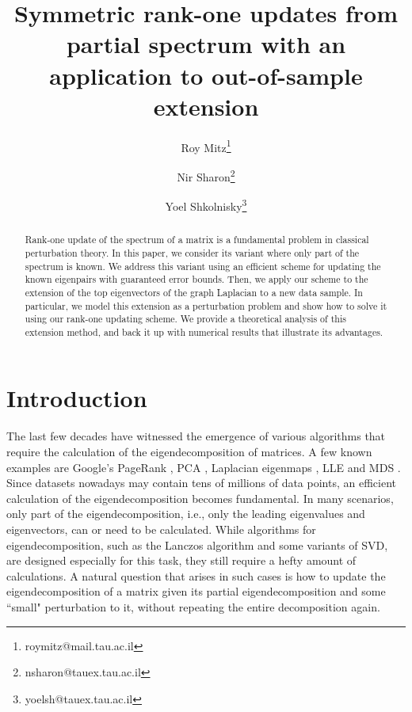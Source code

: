 \documentclass[11pt]{article}
\begin{document}
\title{Symmetric rank-one updates from partial spectrum with an application to out-of-sample extension}

\author[1]{Roy Mitz\thanks{roymitz@mail.tau.ac.il} }
\author[1]{Nir Sharon\thanks{nsharon@tauex.tau.ac.il} }
\author[1]{Yoel Shkolnisky\thanks{yoelsh@tauex.tau.ac.il}}
\date{}

\maketitle
\begin{abstract}
Rank-one update of the spectrum of a matrix is a fundamental problem in classical perturbation theory. In this paper, we consider its variant where only part of the spectrum is known. We address this variant using an efficient scheme for updating the known eigenpairs with guaranteed error bounds. Then, we apply our scheme to the extension of the top eigenvectors of the graph Laplacian to a new data sample. In particular, we model this extension as a perturbation problem and show how to solve it using our rank-one updating scheme. We provide a theoretical analysis of this extension method, and back it up with numerical results that illustrate its advantages.
\end{abstract}



\section{Introduction}

The last few decades have witnessed the emergence of various algorithms that require the calculation of the eigendecomposition of matrices. A few known examples are Google's PageRank \cite{page1999pagerank}, PCA \cite{shlens2014tutorial}, Laplacian eigenmaps \cite{belkin2003laplacian}, LLE \cite{roweis2000nonlinear} and MDS \cite{buja2008data}. Since datasets nowadays may contain tens of millions of data points, an efficient calculation of the eigendecomposition becomes fundamental. In many scenarios, only part of the eigendecomposition, i.e., only the leading eigenvalues and eigenvectors, can or need to be calculated. While algorithms for eigendecomposition, such as the Lanczos algorithm and some variants of SVD, are designed especially for this task, they still require a hefty amount of calculations. A natural question that arises in such cases is how to update the eigendecomposition of a matrix given its partial eigendecomposition and some ``small" perturbation to it, without repeating the entire decomposition again.
\end{document}
